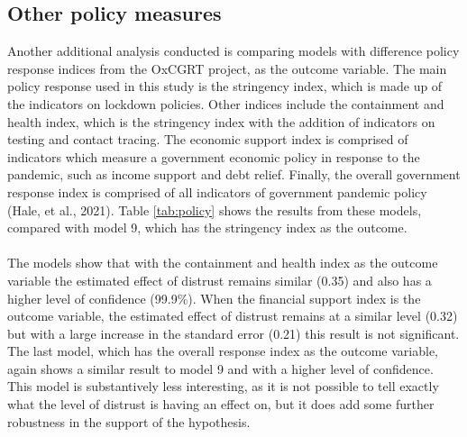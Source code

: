 \documentclass[
  12pt,
]{article}
\begin{document}
\hypertarget{other-policy-measures}{%
\subsection{Other policy measures}\label{other-policy-measures}}

Another additional analysis conducted is comparing models with difference policy response indices from the OxCGRT project, as the outcome variable. The main policy response used in this study is the stringency index, which is made up of the indicators on lockdown policies. Other indices include the containment and health index, which is the stringency index with the addition of indicators on testing and contact tracing. The economic support index is comprised of indicators which measure a government economic policy in response to the pandemic, such as income support and debt relief. Finally, the overall government response index is comprised of all indicators of government pandemic policy (Hale, et al., 2021). Table \ref{tab:policy} shows the results from these models, compared with model 9, which has the stringency index as the outcome.\\
~\\
The models show that with the containment and health index as the outcome variable the estimated effect of distrust remains similar (0.35) and also has a higher level of confidence (99.9\%). When the financial support index is the outcome variable, the estimated effect of distrust remains at a similar level (0.32) but with a large increase in the standard error (0.21) this result is not significant. The last model, which has the overall response index as the outcome variable, again shows a similar result to model 9 and with a higher level of confidence. This model is substantively less interesting, as it is not possible to tell exactly what the level of distrust is having an effect on, but it does add some further robustness in the support of the hypothesis.\\
\end{document}

